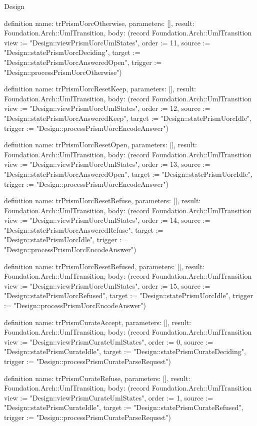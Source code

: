 \begin{lexlean}{Design}
\begin{semanticmodule}
definition{
  name: trPrismUorcOtherwise,
  parameters: [],
  result: Foundation.Arch::UmlTransition,
  body: (record Foundation.Arch::UmlTransition {view := "Design::viewPrismUorcUmlStates", order := 11, source := "Design::statePrismUorcDeciding", target := "Design::statePrismUorcAnsweredOpen", trigger := "Design::processPrismUorcOtherwise"})
}

definition{
  name: trPrismUorcResetKeep,
  parameters: [],
  result: Foundation.Arch::UmlTransition,
  body: (record Foundation.Arch::UmlTransition {view := "Design::viewPrismUorcUmlStates", order := 12, source := "Design::statePrismUorcAnsweredKeep", target := "Design::statePrismUorcIdle", trigger := "Design::processPrismUorcEncodeAnswer"})
}

definition{
  name: trPrismUorcResetOpen,
  parameters: [],
  result: Foundation.Arch::UmlTransition,
  body: (record Foundation.Arch::UmlTransition {view := "Design::viewPrismUorcUmlStates", order := 13, source := "Design::statePrismUorcAnsweredOpen", target := "Design::statePrismUorcIdle", trigger := "Design::processPrismUorcEncodeAnswer"})
}

definition{
  name: trPrismUorcResetRefuse,
  parameters: [],
  result: Foundation.Arch::UmlTransition,
  body: (record Foundation.Arch::UmlTransition {view := "Design::viewPrismUorcUmlStates", order := 14, source := "Design::statePrismUorcAnsweredRefuse", target := "Design::statePrismUorcIdle", trigger := "Design::processPrismUorcEncodeAnswer"})
}

definition{
  name: trPrismUorcResetRefused,
  parameters: [],
  result: Foundation.Arch::UmlTransition,
  body: (record Foundation.Arch::UmlTransition {view := "Design::viewPrismUorcUmlStates", order := 15, source := "Design::statePrismUorcRefused", target := "Design::statePrismUorcIdle", trigger := "Design::processPrismUorcEncodeAnswer"})
}

definition{
  name: trPrismCurateAccept,
  parameters: [],
  result: Foundation.Arch::UmlTransition,
  body: (record Foundation.Arch::UmlTransition {view := "Design::viewPrismCurateUmlStates", order := 0, source := "Design::statePrismCurateIdle", target := "Design::statePrismCurateDeciding", trigger := "Design::processPrismCurateParseRequest"})
}

definition{
  name: trPrismCurateRefuse,
  parameters: [],
  result: Foundation.Arch::UmlTransition,
  body: (record Foundation.Arch::UmlTransition {view := "Design::viewPrismCurateUmlStates", order := 1, source := "Design::statePrismCurateIdle", target := "Design::statePrismCurateRefused", trigger := "Design::processPrismCurateParseRequest"})
}


\end{semanticmodule}
\end{lexlean}
